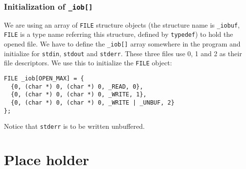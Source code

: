 \documentclass[12pt]{article}
\begin{document}
\subsubsection{Initialization of \texttt{\_iob[]}}
\label{sec:orgb19e09b}
We are using an array of \texttt{FILE} structure objects (the structure name is \texttt{\_iobuf}, \texttt{FILE} is a type name referring this structure, defined by \texttt{typedef}) to hold the opened file. We have to define the \texttt{\_iob[]} array somewhere in the program and initialize for \texttt{stdin}, \texttt{stdout} and \texttt{stderr}. These three files use 0, 1 and 2 as their file descriptors. We use this to initialize the \texttt{FILE} object:
\begin{verbatim}
FILE _iob[OPEN_MAX] = {
  {0, (char *) 0, (char *) 0, _READ, 0},
  {0, (char *) 0, (char *) 0, _WRITE, 1},
  {0, (char *) 0, (char *) 0, _WRITE | _UNBUF, 2}
};
\end{verbatim}

Notice that \texttt{stderr} is to be written unbuffered.

\section{Place holder}
\label{sec:org197f909}
\end{document}
